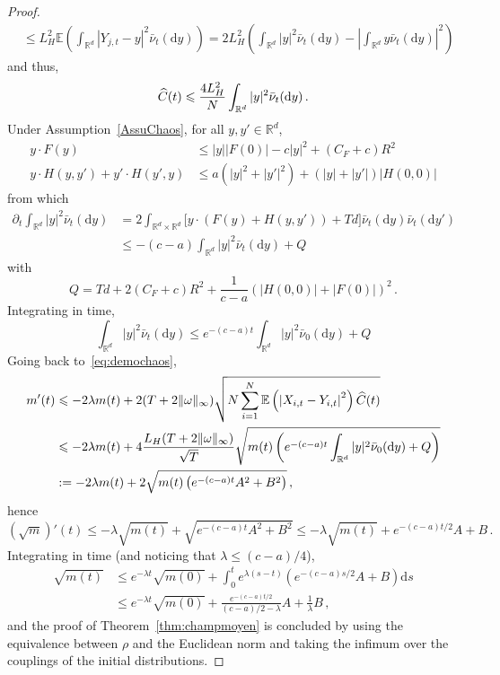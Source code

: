 \documentclass[AHL,Unicode,longabstracts,published]{cedram}
\newcommand{\R}{\mathbb R}
\newcommand{\bbE}{\mathbb E}
\newcommand{\dd}{\mathrm{d}}
\newcommand{\1}{\mathbbm{1}}
\newcommand{\nv}[1]{#1}
\let\oldhat\hat
\renewcommand*{\hat}[1]{\mathchoice{\widehat{#1}}{\widehat{#1}}{\oldhat{#1}}{\oldhat{#1}}}
\newcommand{\R}{\mathbb R}
\begin{document}
\begin{proof}
\begin{align*}
& \leqslant L_H^2 \bbE \left( \int_{\R^d} \left| Y_{j,t}-y \right|^2 \bar \nu_t(\dd y) \right) = 2 L_H^2 \left( \int_{\R^d} |y|^2 \nv{\bar \nu}_t(\dd y) - \left|\int_{\R^d} y \nv{\bar \nu}_t(\dd y)\right|^2\right)
\end{align*}
and thus,
\[
\hat C(t) \leqslant \frac{4L_H^2}{N} \int_{\R^d} |y|^2 \nv{\bar \nu}_t(\dd y)\,.
\]
Under Assumption~\ref{AssuChaos}, for all $y,y'\in\R^d$,
\begin{align*}
y\cdot F(y)& \leqslant |y||F(0)| - c|y|^2 +(C_F+c)R^2 \\
y\cdot H(y,y') + y' \cdot H(y',y) &\leqslant a \left( |y|^2+|y'|^2\right) + \left(|y|+|y'|\right) |H(0,0)|
\end{align*}
from which
\begin{align*}
\partial_t \int_{\R^d} |y|^2 \nv{\bar \nu}_t(\dd y) & = 2\int_{\R^d\times\R^d} \big[ y \cdot \left( F(y) + H(y,y') \right) + T d \big] \nv{\bar \nu}_t(\dd y)\nv{\bar \nu} _t(\dd y')\\
& \leqslant - (c-a) \int_{\R^d} |y|^2 \nv{\bar \nu}_t(\dd y) +Q
\end{align*}
with
\[
Q = Td + 2(C_F+c)R^2 + \frac{1}{c-a}\left( |H(0,0)|+|F(0)|\right)^2\,.
\]
Integrating in time,
\[
\int_{\R^d} |y|^2 \nv{\bar \nu}_t(\dd y) \leqslant e^{-(c-a)t} \int_{\R^d} |y|^2 \nv{\bar \nu}_0(\dd y) + Q
\]
Going back to~\eqref{eq:demochaos},
\begin{align*}
m'(t) &\leqslant -2\lambda m(t) + 2 (T+2\|\nv{\omega}\|_\infty) \sqrt{ N\sum_{i=1}^N \bbE \left( \left|X_{i,t} - Y_{i,t}\right|^2\right) \hat C(t) }\\
& \leqslant -2\lambda m(t) + 4 \frac{L_H(T+2\|\nv{\omega}\|_\infty)}{\sqrt T} \sqrt{m(t)\left( e^{-(c-a)t} \int_{\R^d} |y|^2 \nv{\bar \nu}_0(\dd y) + Q\right) }\\
& := -2\lambda m(t) + 2\sqrt{m(t) \left( e^{-(c-a)t}A^2+B^2\right) }\,,
\end{align*}
hence
\[
\left(\sqrt{m}\right)'(t) \leqslant -\lambda \sqrt{m(t)} + \sqrt{ e^{-(c-a)t}A^2+B^2 } \leqslant -\lambda \sqrt{m(t)} + e^{-(c-a)t/2}A+B \,.
\]
Integrating in time (and noticing that $\lambda \leqslant (c-a)/4$),
\begin{align*}
\sqrt{m(t)} &\leqslant e^{-\lambda t} \sqrt{m(0)} + \int_0^t e^{\lambda(s-t)}\left( e^{-(c-a)s/2} A+ B\right)\dd s \\
&\leqslant e^{-\lambda t} \sqrt{m(0)} + \frac{e^{-(c-a)t/2}}{(c-a)/2-\lambda}A + \frac{1}{\lambda} B \,,
\end{align*}
and the proof of Theorem~\ref{thm:champmoyen} is concluded by using the equivalence between $\rho$ and the Euclidean norm and taking the infimum over the couplings of the initial distributions.
\end{proof}
\end{document}
